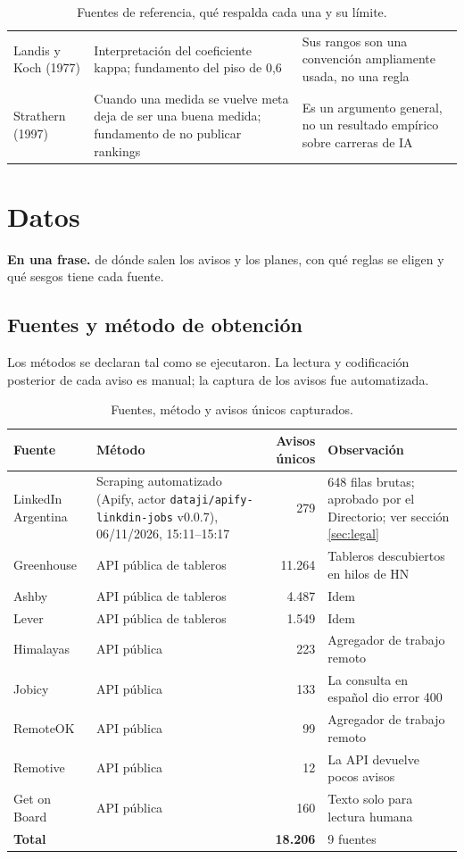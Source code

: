 \documentclass[11pt,a4paper]{article}
\begin{document}
\begin{table}[H]
\begin{tabularx}{\textwidth}{L{3.1cm} X X}
Landis y Koch (1977) \cite{landis1977} & Interpretación del coeficiente kappa; fundamento del piso de 0,6 & Sus rangos son una convención ampliamente usada, no una regla\\
Strathern (1997) \cite{strathern1997} & Cuando una medida se vuelve meta deja de ser una buena medida; fundamento de no publicar rankings & Es un argumento general, no un resultado empírico sobre carreras de IA\\
\bottomrule
\end{tabularx}
\caption{Fuentes de referencia, qué respalda cada una y su límite.}
\end{table}

\section{Datos}
\begin{enunasola}\textbf{En una frase.} de dónde salen los avisos y los planes, con qué reglas se eligen y qué sesgos tiene cada fuente.\end{enunasola}


\subsection{Fuentes y método de obtención}
Los métodos se declaran tal como se ejecutaron. La lectura y codificación posterior de cada aviso es manual; la captura de los avisos fue automatizada.

\begin{table}[H]
\centering\small
\begin{tabularx}{\textwidth}{L{3.2cm} L{4.6cm} r X}
\toprule
{}\textbf{Fuente} & \textbf{Método} & \textbf{Avisos únicos} & \textbf{Observación}\\
\midrule
LinkedIn Argentina & Scraping automatizado (Apify, actor \texttt{dataji/apify-linkdin-jobs} v0.0.7), 06/11/2026, 15:11--15:17 & 279 & 648 filas brutas; aprobado por el Directorio; ver sección \ref{sec:legal}\\
Greenhouse & API pública de tableros & 11.264 & Tableros descubiertos en hilos de HN\\
Ashby & API pública de tableros & 4.487 & Idem\\
Lever & API pública de tableros & 1.549 & Idem\\
Himalayas & API pública & 223 & Agregador de trabajo remoto\\
Jobicy & API pública & 133 & La consulta en español dio error 400\\
RemoteOK & API pública & 99 & Agregador de trabajo remoto\\
Remotive & API pública & 12 & La API devuelve pocos avisos\\
Get on Board & API pública & 160 & Texto solo para lectura humana\\
\midrule
\textbf{Total} & & \textbf{18.206} & 9 fuentes\\
\bottomrule
\end{tabularx}
\caption{Fuentes, método y avisos únicos capturados.}
\end{table}
\end{document}
